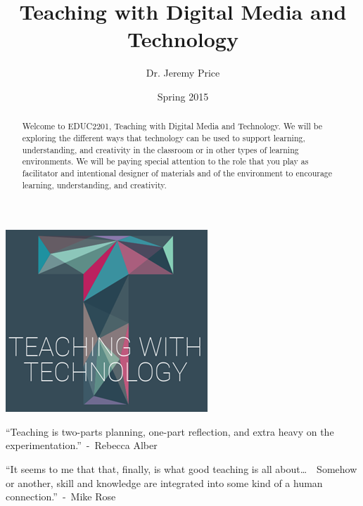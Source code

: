 \documentclass{tufte-handout}
\title{Teaching with Digital Media and Technology}
\author{Dr. Jeremy Price}
\date{Spring 2015}  %
\begin{document}
\maketitle%



\begin{abstract}
Welcome to EDUC2201, Teaching with Digital Media and Technology. We will be exploring the different ways that technology can be used to support learning, understanding, and creativity in the classroom or in other types of learning environments. We will be paying special attention to the role that you play as facilitator and intentional designer of materials and of the environment to encourage learning, understanding, and creativity.\end{abstract}

\bigskip

\begin{fullwidth}
\begin{center}

	\includegraphics[width=0.20\linewidth]{twt-logo.png}
	
	\bigskip
	
	\Large
	\enquote{Teaching is two-parts planning, one-part reflection, and extra heavy on the experimentation.}~-~Rebecca Alber
	
	\bigskip
	
	\enquote{It seems to me that that, finally, is what good teaching is all about\ldots~~Somehow or another, skill and knowledge are integrated into some kind of a human connection.}~-~Mike Rose
	
	\normalsize
\end{center}
\end{fullwidth}
\end{document}
